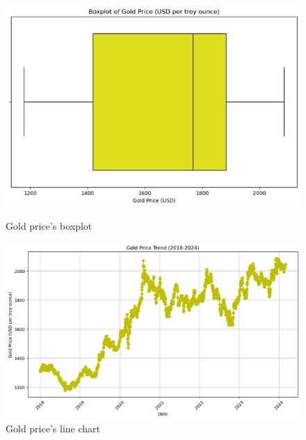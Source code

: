 \documentclass{ieeeojies}
\begin{document}
\begin{figure}[H]
    \centering
    \begin{minipage}{0.23\textwidth}
    \centering
    \includegraphics[width=1\textwidth]{bibliography/Figure/boxplot_gold.png}
    \caption{Gold price's boxplot}
    \label{fig:1}
    \end{minipage}
    \hfill
    \begin{minipage}{0.23\textwidth}
    \centering
    \includegraphics[width=1\textwidth]{bibliography/Figure/line_gold.png}
    \caption{Gold price's line chart}
    \label{fig:2}
    \end{minipage}
\end{figure}
\end{document}

